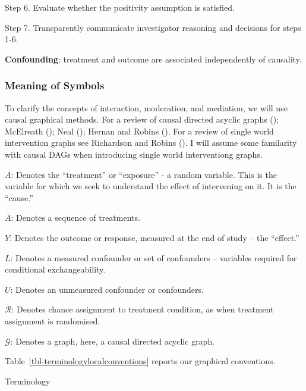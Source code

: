 \documentclass[
  single column]{article}
\begin{document}
Step 6. Evaluate whether the positivity assumption is satisfied.

Step 7. Transparently communicate investigator reasoning and decisions
for steps 1-6.

\textbf{Confounding}: treatment and outcome are associated independently
of causality.

\subsubsection{Meaning of Symbols}\label{meaning-of-symbols}

To clarify the concepts of interaction, moderation, and mediation, we
will use causal graphical methods. For a review of causal directed
acyclic graphs (); McElreath
(); Neal
(); Hernan and Robins
(). For a review of single world
intervention graphs see Richardson and Robins
(). I will assume some
familarity with causal DAGs when introducing single world interventiong
graphs.

\textbf{\(A\)}: Denotes the ``treatment'' or ``exposure'' - a random
variable. This is the variable for which we seek to understand the
effect of intervening on it. It is the ``cause.''

\textbf{\(\bar{A}\)}: Denotes a sequence of treatments.

\textbf{\(Y\)}: Denotes the outcome or response, measured at the end of
study -- the ``effect.''

\textbf{\(L\)}: Denotes a measured confounder or set of confounders --
variables required for conditional exchangeability.

\textbf{\(U\)}: Denotes an unmeasured confounder or confounders.

\textbf{\(\mathcal{R}\)}: Denotes chance assignment to treatment
condition, as when treatment assignment is randomised.

\textbf{\(\mathcal{G}\)}: Denotes a graph, here, a causal directed
acyclic graph.

Table~\ref{tbl-terminologylocalconventions} reports our graphical
conventions.

\newpage{}

\begin{table}

\caption{\label{tbl-terminologylocalconventions}Terminology}

\centering{

\terminologylocalconventions

}

\end{table}%
\end{document}
